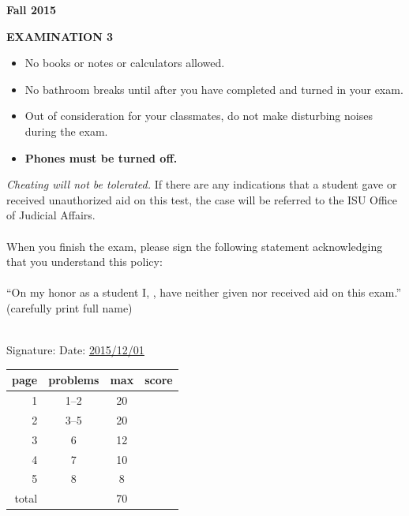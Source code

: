 \documentclass[fleqn,12pt]{article}
\newcommand{\<}{\ensuremath{\langle}}
\renewcommand{\>}{\ensuremath{\rangle}}
\begin{document}
\pagestyle{fancyplain}
\lhead[]{}\chead[]{}\rhead[]{}
\cfoot[]{}

{}
\hfill {\bf Fall 2015}
\begin{center}
{\bf EXAMINATION 3}
\thispagestyle{empty}
\end{center}
\vskip1cm
\begin{itemize}
\item No books or notes or calculators allowed.
\item No bathroom breaks until after you have completed and turned in your exam.
\item Out of consideration for your classmates, do not make
disturbing noises during the exam.
\item {\bf Phones must be turned off.}
\end{itemize}
\vskip1cm
{\it Cheating will not be tolerated.}  If there are any indications that a
  student gave or received unauthorized aid on this test, the case 
  will be referred to the ISU Office of Judicial Affairs.%
\\\\
When you finish the exam, please sign the following statement acknowledging that
you understand  this policy:\\
\\
``On my honor as a student I,
\underline{\phantom{XXXXXXXXXXXXXXXXXXXX}}, have neither
given nor received aid on this exam.''
\hbox{} \hskip 1in {\small (carefully print full name)}\\
\\
\begin{flushright} Signature: \underline{\phantom{XXXXXXXXXXXXXXXXXXXXXXXX}}
  Date: \underline{\phantom{XXX}2015/12/01\phantom{XXX}}
\end{flushright}

\vskip3cm
\begin{center}
  {\Large
\begin{tabular}{r|c|c|l}
page   & problems & max  & score\\[4pt]
\hline
1 & 1--2 &20&\\[4pt]
\hline
2 & 3--5 &20&\\[4pt]
\hline
3 & 6 & 12&\\[4pt]
\hline
4 & 7 & 10&\\[4pt]
\hline
5 & 8 & 8&\\[4pt]
\hline
total & & 70&
\end{tabular}
}
\end{center}
\end{document}

